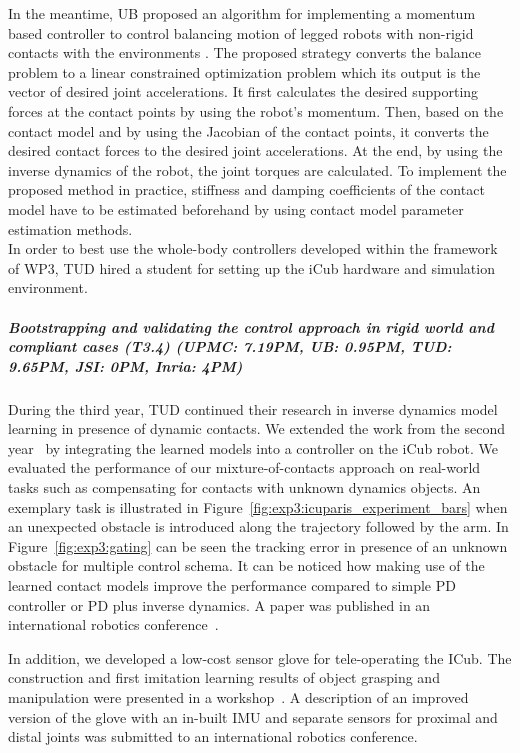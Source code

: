 In the meantime, UB proposed an algorithm for implementing a momentum
based controller to control balancing motion of legged robots with non-rigid
contacts with the environments \cite{Azad&Mistry15}.  The proposed strategy
converts the balance problem to a linear constrained optimization problem
which its output is the vector of desired joint accelerations.  It first
calculates the desired supporting forces at the contact points by using the
robot’s momentum.  Then, based on the contact model and by using the Jacobian
of the contact points, it converts the desired contact forces to the desired
joint accelerations.  At the end, by using the inverse dynamics of the robot,
the joint torques are calculated.  To implement the proposed method in
practice, stiffness and damping coefficients of the contact model have to be
estimated beforehand by using contact model parameter estimation methods.\\
    
In order to best use the whole-body controllers developed within the framework of WP3, TUD hired a student for setting up the iCub hardware and simulation environment.


\subparagraph{Bootstrapping and validating the control approach in rigid world and compliant cases (T3.4) (UPMC: 7.19PM, UB: 0.95PM, TUD: 9.65PM, JSI: 0PM, Inria: 4PM)}

During the third year, TUD continued their research in inverse dynamics model learning in presence of dynamic contacts. 
We extended the work from the second year~\cite{Calandra_ICRA15} by integrating the learned models into a controller on the iCub robot.
We evaluated the performance of our mixture-of-contacts approach on real-world tasks such as compensating for contacts with unknown dynamics objects.
An exemplary task is illustrated in Figure~\ref{fig:exp3:icuparis_experiment_bars} when an unexpected obstacle is introduced along the trajectory followed by the arm.
In Figure~\ref{fig:exp3:gating} can be seen the tracking error in presence of an unknown obstacle for multiple control schema. 
It can be noticed how making use of the learned contact models improve the performance compared to simple PD controller or PD plus inverse dynamics.
A paper was published in an international robotics conference~\cite{calandra2015learning}.

In addition, we developed a low-cost sensor glove for tele-operating the ICub. The construction and first imitation learning results of object grasping and manipulation 
were presented in a workshop~\cite{RueckertICRAWS2015}. A description of an improved version of the glove with an in-built IMU and separate sensors for proximal and distal joints 
was submitted to an international robotics conference. 

